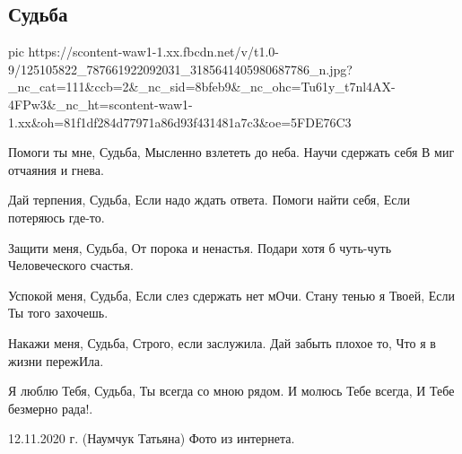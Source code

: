  
 
 

\subsection{Судьба}

\ifcmt
pic https://scontent-waw1-1.xx.fbcdn.net/v/t1.0-9/125105822_787661922092031_3185641405980687786_n.jpg?_nc_cat=111&ccb=2&_nc_sid=8bfeb9&_nc_ohc=Tu61y_t7nl4AX-4FPw3&_nc_ht=scontent-waw1-1.xx&oh=81f1df284d77971a86d93f431481a7c3&oe=5FDE76C3
\fi

\begin{multicols}{2}
\obeycr
Помоги ты мне, Судьба,
Мысленно взлететь до неба.
Научи сдержать себя
В миг отчаяния и гнева.

Дай терпения, Судьба,
Если надо ждать ответа.
Помоги найти себя,
Если потеряюсь где-то.

Защити меня, Судьба,
От порока и ненастья.
Подари хотя б чуть-чуть
Человеческого счастья.

Успокой меня, Судьба,
Если слез сдержать нет мОчи.
Стану тенью я Твоей,
Если Ты того захочешь.

Накажи меня, Судьба,
Строго, если заслужила.
Дай забыть плохое то, 
Что я в жизни пережИла.

Я люблю Тебя, Судьба,
Ты всегда со мною рядом.
И молюсь Тебе всегда,
И Тебе безмерно рада!.

 12.11.2020 г. (Наумчук Татьяна)
 Фото из интернета.
\restorecr
\end{multicols}

